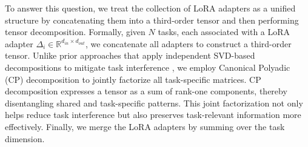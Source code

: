 \documentclass[10pt]{article} %
\begin{document}
    
    
    
    

 
    
    
To answer this question, we treat the collection of LoRA adapters as a unified structure by concatenating them into a third-order tensor and then performing tensor decomposition. Formally, given $N$ tasks, each associated with a LoRA adapter $\Delta_{i} \in \mathbb{R}^{d_{in} \times d_{out}}$, we concatenate all adapters to construct a third-order tensor. Unlike prior approaches that apply independent SVD-based decompositions to mitigate task interference \citep{stoica2025model,gargiulo2025task}, we employ Canonical Polyadic (CP) decomposition to jointly factorize all task-specific matrices. CP decomposition expresses a tensor as a sum of rank-one components, thereby disentangling shared and task-specific patterns. This joint factorization not only helps reduce task interference but also preserves task-relevant information more effectively. Finally, we merge the LoRA adapters by summing over the task dimension.
    
\end{document}

